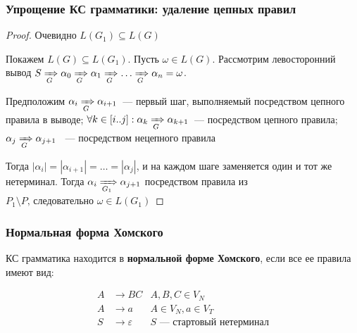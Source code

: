 \documentclass{beamer}
\newcommand{\derivegone}[1]{\xRightarrow[#1]{}}
\begin{document}
\begin{frame}[fragile]
  \transwipe[direction=90]
  \frametitle{Упрощение КС грамматики: удаление цепных правил}    
  \begin{proof}   
   Очевидно $L(G_1) \subseteq L(G)$
   
   Покажем $L(G) \subseteq L(G_1)$. Пусть $\omega \in L(G)$. Рассмотрим левосторонний вывод $S \derivegone{G} \alpha_0 \derivegone{G} \alpha_1 \derivegone{G} \dots \derivegone{G} \alpha_n = \omega$.
   
   Предположим $\alpha_i \derivegone{G} \alpha_{i+1}$~--- первый шаг, выполняемый посредством цепного правила в выводе; $\forall k \in [i..j]: \alpha_k \derivegone{G} \alpha_{k+1}$~--- посредством цепного правила;  $\alpha_j \derivegone{G} \alpha_{j+1}$ ~--- посредством нецепного правила
   
   Тогда $|\alpha_i| = |\alpha_{i+1}| = \dots = |\alpha_j|$, и на каждом шаге заменяется один и тот же нетерминал. Тогда $\alpha_i \derivegone{G_1} \alpha_{j+1} $ посредством правила из $P_1 \setminus P \text{, следовательно } \omega \in L(G_1)$
   \end{proof}
   
\end{frame}

\begin{frame}[fragile]
  \transwipe[direction=90]
  \frametitle{Нормальная форма Хомского}    
  КС грамматика находится в \textbf{нормальной форме Хомского}, если все ее правила имеют вид: 
  
\begin{align*}
  A &\to B C         & A, B, C \in V_N \\ 
  A &\to a           & A \in V_N, a \in V_T\\
  S &\to \varepsilon & S \text{ --- стартовый нетерминал}
\end{align*}
 
\end{frame}
\end{document}
